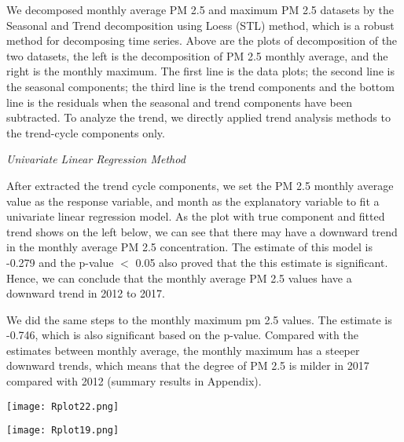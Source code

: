\documentclass[11pt,]{article}
\begin{document}
\vspace{3mm}

We decomposed monthly average PM 2.5 and maximum PM 2.5 datasets by the Seasonal and Trend decomposition using Loess (STL) method, which is a robust method for decomposing time series. Above are the plots of decomposition of the two datasets, the left is the decomposition of PM 2.5 monthly average, and the right is the monthly maximum. The first line is the data plots; the second line is the seasonal components; the third line is the trend components and the bottom line is the residuals when the seasonal and trend components have been subtracted. To analyze the trend, we directly applied trend analysis methods to the trend-cycle components only.

\vspace{3mm}

\noindent\emph{Univariate Linear Regression Method}

\vspace{3mm}

After extracted the trend cycle components, we set the PM 2.5 monthly average value as the response variable, and month as the explanatory variable to fit a univariate linear regression model.  As the plot with true component and fitted trend shows on the left below, we can see that there may have a downward trend in the monthly average PM 2.5 concentration. The estimate of this model is -0.279 and the p-value $<$ 0.05 also proved that the this estimate is significant. Hence, we can conclude that the monthly average PM 2.5 values have a downward trend in 2012 to 2017. 

We did the same steps to the monthly maximum pm 2.5 values. The estimate is -0.746, which is also significant based on the p-value. Compared with the estimates between monthly average, the monthly maximum has a steeper downward trends, which means that the degree of PM 2.5 is milder in 2017 compared with 2012 (summary results in Appendix). 

\vspace{3mm}

\begin{minipage}{.45\linewidth}
\begin{flushleft}

{\texttt{[image: Rplot22.png]}}

\end{flushleft} 
\end{minipage}
\hfill
\begin{minipage}{.45\linewidth}
\begin{flushright} 

{\texttt{[image: Rplot19.png]}}

\end{flushright} 
\end{minipage}
\end{document}
